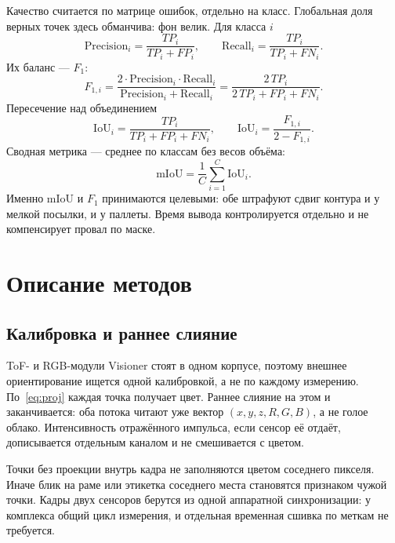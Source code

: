 \documentclass{misisarticle}
\begin{document}
Качество считается по матрице ошибок, отдельно на класс. Глобальная доля верных точек здесь обманчива: фон велик. Для класса $i$
\begin{equation}
\mathrm{Precision}_i = \frac{TP_i}{TP_i + FP_i},
\qquad
\mathrm{Recall}_i = \frac{TP_i}{TP_i + FN_i}.
\label{eq:pr}
\end{equation}
Их баланс --- $F_1$:
\begin{equation}
F_{1,i}
=
\frac{2 \cdot \mathrm{Precision}_i \cdot \mathrm{Recall}_i}
{\mathrm{Precision}_i + \mathrm{Recall}_i}
=
\frac{2\,TP_i}{2\,TP_i + FP_i + FN_i}.
\label{eq:f1}
\end{equation}
Пересечение над объединением
\begin{equation}
\mathrm{IoU}_i
=
\frac{TP_i}{TP_i + FP_i + FN_i},
\qquad
\mathrm{IoU}_i = \frac{F_{1,i}}{2 - F_{1,i}}.
\label{eq:iou}
\end{equation}
Сводная метрика --- среднее по классам без весов объёма:
\begin{equation}
\mathrm{mIoU}
=
\frac{1}{C}
\sum_{i=1}^{C}
\mathrm{IoU}_i.
\label{eq:miou}
\end{equation}
Именно mIoU и $F_1$ принимаются целевыми: обе штрафуют сдвиг контура и у мелкой посылки, и у паллеты. Время вывода контролируется отдельно и не компенсирует провал по маске.

\section{Описание методов}

\subsection{Калибровка и раннее слияние}

ToF- и RGB-модули Visioner стоят в одном корпусе, поэтому внешнее ориентирование ищется одной калибровкой, а не по каждому измерению. По~\eqref{eq:proj} каждая точка получает цвет. Раннее слияние на этом и заканчивается: оба потока читают уже вектор $(x, y, z, R, G, B)$, а не голое облако. Интенсивность отражённого импульса, если сенсор её отдаёт, дописывается отдельным каналом и не смешивается с цветом.

Точки без проекции внутрь кадра не заполняются цветом соседнего пикселя. Иначе блик на раме или этикетка соседнего места становятся признаком чужой точки. Кадры двух сенсоров берутся из одной аппаратной синхронизации: у комплекса общий цикл измерения, и отдельная временная сшивка по меткам не требуется.
\end{document}
